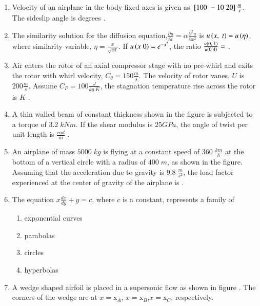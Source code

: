 \documentclass[journal,12pt,onecolumn]{IEEEtran}
\theoremstyle{remark}
\begin{document}
\begin{enumerate}
\item Velocity of an airplane in the body fixed axes is given as ${}\left[100\;-10\;20\right] \frac{m}{s}$. The sideslip angle is \underline{\hspace{2cm}} degrees .
\item The similarity solution for the diffusion equation,$\frac{\partial u}{\partial t}=\alpha \frac{\partial^2u}{\partial x^2}$ is $u\left(x,\;t\right)=u\left(\eta\right)$, where similarity variable, $\eta=\frac{x}{\sqrt{\alpha t}}$. If $u\left(x\;0\right)=e^{-x^2}$, the ratio $\frac{u\left(0,\;1\right)}{u\left(0\;4\right)}=$ \underline{\hspace{2cm}} .
\item Air enters the rotor of an axial compressor stage with no pre-whirl  and exits the rotor with whirl velocity, $C_\theta=150\frac{m}{s}$. The velocity of rotor vanes, $U$ is $200 \frac{m}{s}$. Assume $C_P=100\frac{J}{kg\;K}$, the stagnation temperature rise across the rotor is \underline{\hspace{2cm}} $K$ .
\item A thin walled beam of constant thickness shown in the figure is subjected to a torque of $3.2\;kNm$. If the shear modulus is $25 GPa$, the angle of twist per unit length is \underline{\hspace{2cm}} $\frac{rad}{m}$ .

\item An airplane of mass $5000\;kg$ is flying at a constant speed of $360\;\frac{km}{h}$ at the bottom of a vertical circle with a radius of $400\;m$, as shown in the figure. Assuming that the acceleration due to gravity is $9.8\;\frac{m}{s^2}$, the load factor experienced at the center of gravity of the airplane is \underline{\hspace{2cm}} . 

\item The equation $x\frac{dx}{dy}+y=c$, where $c$ is a constant, represents a family of
\begin{enumerate}
    \item exponential curves 
    \item parabolas 
    \item circles
    \item hyperbolas
\end{enumerate}
\item A wedge shaped airfoil is placed in a supersonic flow as shown in figure . The corners of the wedge are at $x=\text{x}_A$, $x=\text{x}_B$,\;$x=\text{x}_C$, respectively.\\

\end{enumerate}
\end{document}
